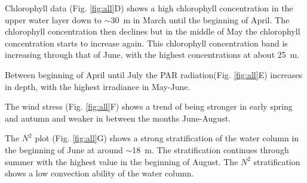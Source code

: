 \documentclass[../Main.tex]{subfiles}
\begin{document}
Chlorophyll data (Fig. \ref{fig:all}D) shows a high chlorophyll concentration in the upper water layer down to $\sim$\SI{30}{\metre} in March until the beginning of April. The chlorophyll concentration then declines but in the middle of May the chlorophyll concentration starts to increase again.
This chlorophyll concentration band is increasing through that of June, with the highest concentrations at about \SI{25}{\metre}.

Between beginning of April until July the PAR radiation(Fig. \ref{fig:all}E) increases in depth, with the highest irradiance in May-June.

The wind stress (Fig. \ref{fig:all}F) shows a trend of being stronger in early spring and autumn and weaker in between the months June-August.

The $N^2$ plot (Fig. \ref{fig:all}G) shows a strong stratification of the water column in the beginning of June at around  $\sim$\SI{18}{\metre}. The stratification continues through summer with the highest value in the beginning of August. The $N^2$ stratification shows a low convection ability of the water column. 
\end{document}
